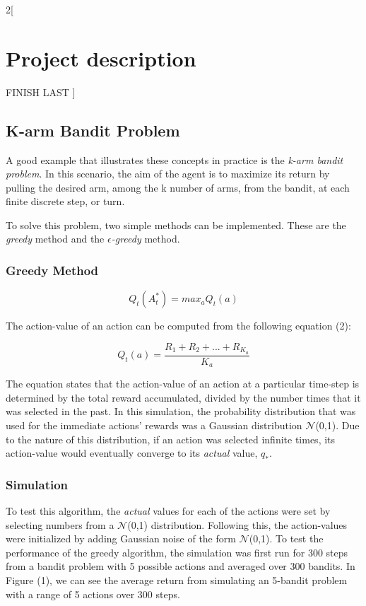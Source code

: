 \documentclass[a4paper]{article}
\begin{document}
\begin{multicols}{2}[
		\section*{Project description}
		FINISH LAST
		]
		\subsection{K-arm Bandit Problem}
		A good example that illustrates these concepts in practice is the \textit{k-arm bandit problem}. In this scenario, the aim of the agent is to maximize its return by pulling the desired arm, among the k number of arms, from the bandit, at each finite discrete step, or turn.  
		
		To solve this problem, two simple methods can be implemented. These are the \textit{greedy} method and the \textit{$\epsilon$-greedy} method.
		
		\subsubsection{Greedy Method}
		
		
		
		\begin{equation}
			Q_t(A_t^*) = max_a Q_t(a)
		\end{equation}
		
		The action-value of an action can be computed from the following equation (2):
		
		\begin{equation}
			Q_t(a) = \frac{R_1 + R_2 + ... + R_{K_a}}{K_a}
		\end{equation}

		The equation states that the action-value of an action at a particular time-step is determined by the total reward accumulated, divided by the number times that it was selected in the past. In this simulation, the probability distribution that was used for the immediate actions' rewards was a Gaussian distribution $\mathcal{N}$(0,1). Due to the nature of this distribution, if an action was selected infinite times, its action-value would eventually converge to its \textit{actual} value, $q_*$.
		
		\subsubsection{Simulation}
		To test this algorithm, the \textit{actual} values for each of the actions were set by selecting numbers from a $\mathcal{N}$(0,1) distribution. Following this, the action-values were initialized by adding Gaussian noise of the form $\mathcal{N}$(0,1). To test the performance of the greedy algorithm, the simulation was first run for 300 steps from a bandit problem with 5 possible actions and averaged over 300 bandits. In Figure (1), we can see the average return from simulating an 5-bandit problem with a range of 5 actions over 300 steps.


\end{multicols}
\end{document}
